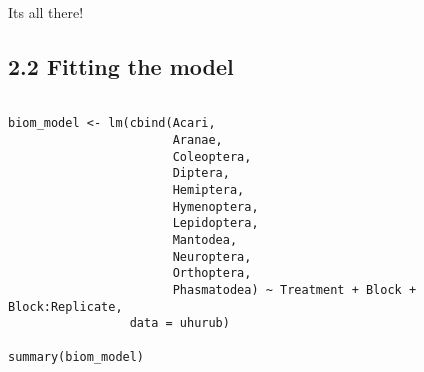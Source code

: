 \documentclass[11pt]{article}
\begin{document}
Its all there!

\subsection*{2.2 Fitting the model}
\label{sec:orgeb06229}

\begin{verbatim}

biom_model <- lm(cbind(Acari,
                       Aranae,
                       Coleoptera,
                       Diptera,
                       Hemiptera,
                       Hymenoptera,
                       Lepidoptera,
                       Mantodea,
                       Neuroptera,
                       Orthoptera,
                       Phasmatodea) ~ Treatment + Block + Block:Replicate,
                 data = uhurub)

summary(biom_model)

\end{verbatim}
\end{document}
